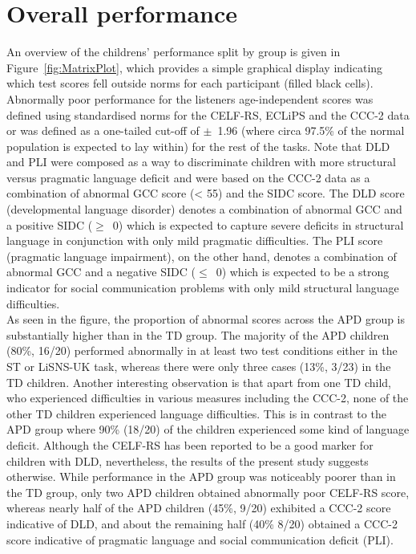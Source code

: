 \documentclass[a4paper, twoside]{templates/ociamthesis}
\begin{document}
\hypertarget{overall-performance}{%
\section{Overall performance}\label{overall-performance}}

An overview of the childrens' performance split by group is given in Figure~\ref{fig:MatrixPlot}, which provides a simple graphical display indicating which test scores fell outside norms for each participant (filled black cells). Abnormally poor performance for the listeners age-independent scores was defined using standardised norms for the CELF-RS, ECLiPS and the CCC-2 data or was defined as a one-tailed cut-off of \(\pm\)~1.96 (where circa 97.5\% of the normal population is expected to lay within) for the rest of the tasks. Note that DLD and PLI were composed as a way to discriminate children with more structural versus pragmatic language deficit and were based on the CCC-2 data as a combination of abnormal GCC score (\textless{} 55) and the SIDC score. The DLD score (developmental language disorder) denotes a combination of abnormal GCC and a positive SIDC (\(\geq\)~0) which is expected to capture severe deficits in structural language in conjunction with only mild pragmatic difficulties. The PLI score (pragmatic language impairment), on the other hand, denotes a combination of abnormal GCC and a negative SIDC (\(\leq\)~0) which is expected to be a strong indicator for social communication problems with only mild structural language difficulties.\\

As seen in the figure, the proportion of abnormal scores across the APD group is substantially higher than in the TD group. The majority of the APD children (80\%, 16/20) performed abnormally in at least two test conditions either in the ST or LiSNS-UK task, whereas there were only three cases (13\%, 3/23) in the TD children. Another interesting observation is that apart from one TD child, who experienced difficulties in various measures including the CCC-2, none of the other TD children experienced language difficulties. This is in contrast to the APD group where 90\% (18/20) of the children experienced some kind of language deficit. Although the CELF-RS has been reported to be a good marker for children with DLD, nevertheless, the results of the present study suggests otherwise. While performance in the APD group was noticeably poorer than in the TD group, only two APD children obtained abnormally poor CELF-RS score, whereas nearly half of the APD children (45\%, 9/20) exhibited a CCC-2 score indicative of DLD, and about the remaining half (40\% 8/20) obtained a CCC-2 score indicative of pragmatic language and social communication deficit (PLI).\\
\end{document}
